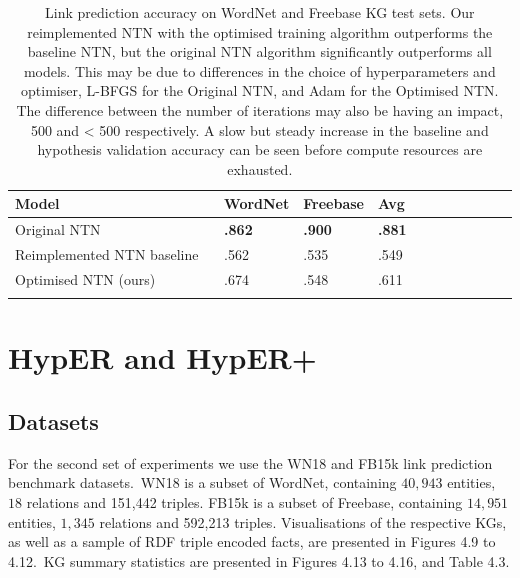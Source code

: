 \begin{table}[H]
	\centering
	\begin{tabular}{lllllllllll}
  		\textbf{Model} & \textbf{WordNet} & \textbf{Freebase} & \textbf{Avg} \\
  		\hline
  		Original NTN \unskip ~\citep{socher2013reasoning} & \textbf{.862} & \textbf{.900} & \textbf{.881} \\
  		Reimplemented NTN baseline  \unskip ~\citep{Doss2015} & .562 & .535 & .549 \\
  		\hline
  		Optimised NTN (ours) & .674 & .548 & .611 \\
		&
	\end{tabular}
	\captionsetup{justification=centering}
	\caption{Link prediction accuracy on WordNet and Freebase KG test sets. Our reimplemented NTN with the optimised training algorithm outperforms the baseline NTN, but the original NTN algorithm significantly outperforms all models. This may be due to differences in the choice of hyperparameters and optimiser, L-BFGS for the Original NTN, and Adam for the Optimised NTN. The difference between the number of iterations may also be having an impact, 500 and < 500 respectively. A slow but steady increase in the baseline and hypothesis validation accuracy can be seen before compute resources are exhausted.}
\end{table}



\section{HypER and HypER+}

\subsection{Datasets} 
For the second set of experiments we use the WN18 \citep{bordes2013translating} and FB15k \citep{bordes2013translating} link prediction benchmark datasets.\ WN18 is a subset of WordNet, containing $ 40, 943 $ entities, $ 18 $ relations and 151,442 triples. FB15k is a subset of Freebase, containing $ 14, 951 $ entities, $ 1, 345 $ relations and 592,213 triples. Visualisations of the respective KGs, as well as a sample of RDF triple encoded facts, are presented in Figures 4.9 to 4.12.\ KG summary statistics are presented in Figures 4.13 to 4.16, and Table 4.3. 

